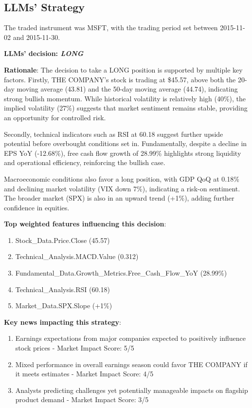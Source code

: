 \documentclass[8pt]{scrartcl}
\begin{document}
\newpage

\subsection*{LLMs' Strategy} \label{strategy4}

The traded instrument was MSFT, with the trading period set between 2015-11-02 and 2015-11-30.

\textbf{LLMs' decision: \textit{LONG}}

\textbf{Rationale}: The decision to take a LONG position is supported by multiple key factors. Firstly, THE COMPANY's stock is trading at \$45.57, above both the 20-day moving average (43.81) and the 50-day moving average (44.74), indicating strong bullish momentum. While historical volatility is relatively high (40\%), the implied volatility (27\%) suggests that market sentiment remains stable, providing an opportunity for controlled risk.

Secondly, technical indicators such as RSI at 60.18 suggest further upside potential before overbought conditions set in. Fundamentally, despite a decline in EPS YoY (-12.68\%), free cash flow growth of 28.99\% highlights strong liquidity and operational efficiency, reinforcing the bullish case.

Macroeconomic conditions also favor a long position, with GDP QoQ at 0.18\% and declining market volatility (VIX down 7\%), indicating a risk-on sentiment. The broader market (SPX) is also in an upward trend (+1\%), adding further confidence in equities.

\textbf{Top weighted features influencing this decision}:
\begin{enumerate}
    \item Stock\_Data.Price.Close (45.57)
    \item Technical\_Analysis.MACD.Value (0.312)
    \item Fundamental\_Data.Growth\_Metrics.Free\_Cash\_Flow\_YoY (28.99\%)
    \item Technical\_Analysis.RSI (60.18)
    \item Market\_Data.SPX.Slope (+1\%)
\end{enumerate}

\textbf{Key news impacting this strategy}:
\begin{enumerate}
    \item Earnings expectations from major companies expected to positively influence stock prices - Market Impact Score: 5/5
    \item Mixed performance in overall earnings season could favor THE COMPANY if it meets estimates - Market Impact Score: 4/5
    \item Analysts predicting challenges yet potentially manageable impacts on flagship product demand - Market Impact Score: 3/5
\end{enumerate}
\end{document}
